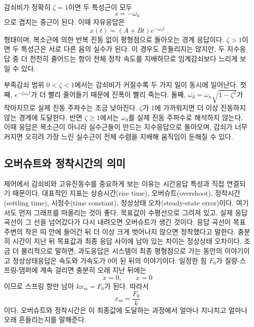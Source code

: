 감쇠비가 정확히 $\zeta=1$이면 두 특성근이 모두
\begin{equation}
  s=-\omega_n
\end{equation}
으로 겹치는 중근이 된다.
이때 자유응답은
\begin{equation}
  x(t)=(A+Bt)e^{-\omega_n t}
\end{equation}
형태이며, 복소근에 의한 반복 진동 없이 평형점으로 돌아오는 경계 응답이다.
$\zeta>1$이면 두 특성근은 서로 다른 음의 실수가 된다.
이 경우도 흔들리지는 않지만, 두 지수응답 중 더 천천히 줄어드는 항이 전체 정착 속도를 지배하므로 임계감쇠보다 느리게 보일 수 있다.

부족감쇠 범위 $0<\zeta<1$에서는 감쇠비가 커질수록 두 가지 일이 동시에 일어난다.
첫째, $e^{-\zeta\omega_n t}$가 더 빨리 줄어들기 때문에 진폭이 빨리 죽는다.
둘째, $\omega_d=\omega_n\sqrt{1-\zeta^2}$가 작아지므로 실제 진동 주파수는 조금 낮아진다.
$\zeta$가 1에 가까워지면 더 이상 진동하지 않는 경계에 도달한다.
반면 $\zeta\ge1$에서는 $\omega_d$를 실제 진동 주파수로 해석하지 않는다.
이때 응답은 복소근이 아니라 실수근들이 만드는 지수응답으로 돌아오며, 감쇠가 너무 커지면 오히려 가장 느린 실수근이 전체 수렴을 지배해 움직임이 둔해질 수 있다.

\subsection{오버슈트와 정착시간의 의미}

제어에서 감쇠비와 고유진동수를 중요하게 보는 이유는 시간응답 특성과 직접 연결되기 때문이다.
대표적인 지표는 상승시간(rise time), 오버슈트(overshoot), 정착시간(settling time), 시정수(time constant), 정상상태 오차(steady-state error)이다.
여기서도 먼저 그래프를 떠올리는 것이 좋다.
목표값이 수평선으로 그려져 있고, 실제 응답 곡선이 그 선을 넘어갔다가 다시 내려오면 오버슈트가 생긴 것이다.
응답 곡선이 목표 주변의 작은 띠 안에 들어간 뒤 더 이상 크게 벗어나지 않으면 정착했다고 말한다.
충분히 시간이 지난 뒤 목표값과 최종 응답 사이에 남아 있는 차이는 정상상태 오차이다.
조금 더 물리적으로 말하면, 과도응답은 시스템이 최종 평형점으로 가는 동안의 이야기이고 정상상태응답은 속도와 가속도가 0이 된 뒤의 이야기이다.
일정한 힘 $F_0$가 질량-스프링-댐퍼에 계속 걸리면 충분히 오래 지난 뒤에는
\begin{equation}
  \dot{x}=0,\qquad \ddot{x}=0
\end{equation}
이므로 스프링 항만 남아 $kx_{\mathrm{ss}}=F_0$가 된다.
따라서
\begin{equation}
  x_{\mathrm{ss}}=\frac{F_0}{k}
\end{equation}
이다.
오버슈트와 정착시간은 이 최종값에 도달하는 과정에서 얼마나 지나치고 얼마나 오래 흔들리는지를 말해준다.

